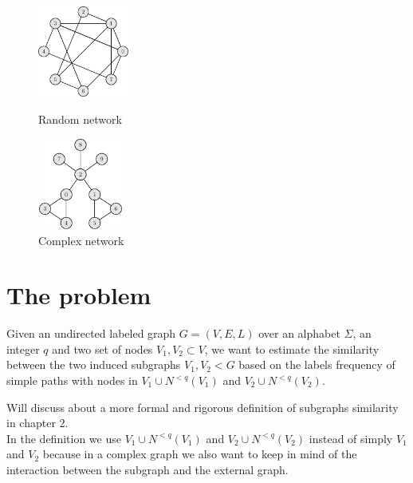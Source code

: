 \begin{figure}[h]
	\centering
	\begin{minipage}[t]{.45\textwidth}
		\centering
		\includegraphics[width=3cm,height=3cm]{figure/figure-1-3}
		\caption{Random network}
	\end{minipage}\hfill
	\begin{minipage}[t]{.45\textwidth}
		\centering
		\includegraphics[width=2.8cm,height=3cm]{figure/figure-1-4}
		\caption{Complex network}
	\end{minipage}
\end{figure}

\clearpage
\section{The problem}

\begin{problema}
Given an undirected labeled graph $G=(V,E,L)$ over an alphabet $\Sigma$, an integer $q$
and two set of nodes $V_{1}, V_{2} \subset V$, we want to estimate the similarity between the two induced subgraphs $V_{1}, V_{2} < G$ based on the labels frequency of simple paths with nodes in $V_{1} \cup N^{<q}(V_{1})$ and $V_{2} \cup N^{<q}(V_{2})$.

\end{problema}

Will discuss about a more formal and rigorous definition of subgraphs similarity in chapter 2.\\

In the definition we use $V_{1} \cup N^{<q}(V_{1})$ and $V_{2} \cup N^{<q}(V_{2})$ instead of simply $V_{1}$ and $V_{2}$ because in a complex graph we also want to keep in mind of the interaction between the subgraph and the external graph.\\

